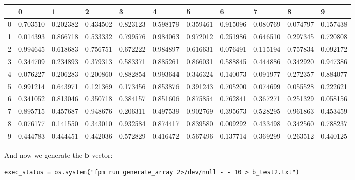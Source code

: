 \bigskip\noindent
\begin{tabular}{p{}p{}p{}p{}p{}p{}p{}p{}p{}p{}p{}}
\toprule
 & 0 & 1 & 2 & 3 & 4 & 5 & 6 & 7 & 8 & 9 \\
\hline
0 & 0.703510 & 0.202382 & 0.434502 & 0.823123 & 0.598179 & 0.359461 & 0.915096 & 0.080769 & 0.074797 & 0.157438 \\
\hline
1 & 0.014393 & 0.866718 & 0.533332 & 0.799576 & 0.984063 & 0.972012 & 0.251986 & 0.646510 & 0.297345 & 0.720808 \\
\hline
2 & 0.994645 & 0.618683 & 0.756751 & 0.672222 & 0.984897 & 0.616631 & 0.076491 & 0.115194 & 0.757834 & 0.092172 \\
\hline
3 & 0.344709 & 0.234893 & 0.379313 & 0.583371 & 0.885261 & 0.866031 & 0.588845 & 0.444886 & 0.342920 & 0.947386 \\
\hline
4 & 0.076227 & 0.206283 & 0.200860 & 0.882854 & 0.993644 & 0.346324 & 0.140073 & 0.091977 & 0.272357 & 0.884077 \\
\hline
5 & 0.991214 & 0.643971 & 0.121369 & 0.173456 & 0.853876 & 0.391243 & 0.705200 & 0.074699 & 0.055528 & 0.222621 \\
\hline
6 & 0.341052 & 0.813046 & 0.350718 & 0.384157 & 0.851606 & 0.875854 & 0.762841 & 0.367271 & 0.251329 & 0.058156 \\
\hline
7 & 0.895715 & 0.457687 & 0.948676 & 0.206311 & 0.497539 & 0.902769 & 0.395673 & 0.528295 & 0.961863 & 0.453459 \\
\hline
8 & 0.076177 & 0.141550 & 0.343010 & 0.932584 & 0.874417 & 0.839580 & 0.009292 & 0.433498 & 0.342560 & 0.788237 \\
\hline
9 & 0.444783 & 0.444451 & 0.442036 & 0.572829 & 0.416472 & 0.567496 & 0.137714 & 0.369299 & 0.263512 & 0.440125 \\
\hline
\bottomrule
\end{tabular}

\bigskip

And now we generate the $\mathbf{b}$ vector:

\begin{verbatim}
exec_status = os.system("fpm run generate_array 2>/dev/null - - 10 > b_test2.txt")
\end{verbatim}

